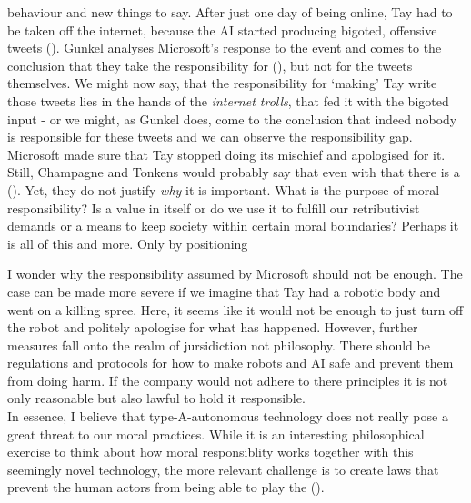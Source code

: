 \documentclass{article}
\begin{document}
behaviour and new things to say. After just one day of being online, Tay had to
be taken off the internet, because the AI started producing bigoted, offensive
tweets (\cite[p. 312]{gunkel2020mind}). Gunkel analyses
Microsoft's response to the event and comes to the conclusion that they take the
responsibility for  (\cite[p.
312, italics in the original]{gunkel2020mind}), but not for the tweets
themselves. We might now say, that the responsibility for `making' Tay write
those tweets lies in the hands of the \textit{internet trolls}, that fed it with
the bigoted input - or we might, as Gunkel does, come to the conclusion that
indeed nobody is responsible for these tweets and we can observe the
responsibility gap. Microsoft made sure that Tay stopped doing its mischief and
apologised for it. Still, Champagne and Tonkens would probably say that even
with that there is a  (\cite[p.
130, italics in the original]{champagne2015bridging}). Yet, they do not justify
\textit{why} it is important. What is the purpose of moral responsibility? Is a
value in itself or do we use it to fulfill our retributivist demands or a means
to keep society within certain moral boundaries? Perhaps it is all of this and
more. Only by positioning 

I wonder why the responsibility assumed by
Microsoft should not be enough. The case can be made more severe if we imagine
that Tay had a robotic body and went on a killing spree. Here, it seems like it
would not be enough to just turn off the robot and politely apologise for what
has happened. However, further measures fall onto the realm of jursidiction not
philosophy. There should be regulations and protocols for how to make robots and
AI safe and prevent them from doing harm. If the company would not adhere to
there principles it is not only reasonable but also lawful to hold it
responsible.\\
In essence, I believe that type-A-autonomous technology does not really pose a
great threat to our moral practices. While it is an interesting philosophical
exercise to think about how moral responsiblity works together with this
seemingly novel technology, the more relevant challenge is to create laws that
prevent the human actors from being able to play the
 (\cite{tufekci2016}).\\
\end{document}
